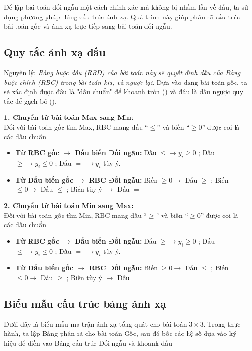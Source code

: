 
Để lập bài toán đối ngẫu một cách chính xác mà không bị nhầm lẫn về dấu, ta sử dụng phương pháp Bảng cấu trúc ánh xạ. Quá trình này giúp phân rã cấu trúc bài toán gốc và ánh xạ trực tiếp sang bài toán đối ngẫu.

\subsection{Quy tắc ánh xạ dấu}
Nguyên lý: \textit{Ràng buộc dấu (RBD) của bài toán này sẽ quyết định dấu của Ràng buộc chính (RBC) trong bài toán kia, và ngược lại.} Dựa vào dạng bài toán gốc, ta sẽ xác định được đâu là "dấu chuẩn" để khoanh tròn (\khoanh{}) và đâu là dấu ngược quy tắc để gạch bỏ (\cancel{}).

\textbf{1. Chuyển từ bài toán Max sang Min:}\\
Đối với bài toán gốc tìm Max, RBC mang dấu ``$\le$'' và biến ``$\ge 0$'' được coi là các dấu chuẩn.
\begin{itemize}
    \item \textbf{Từ RBC gốc $\rightarrow$ Dấu biến Đối ngẫu:} Dấu $\le \longrightarrow y_i \ge 0$ ; Dấu $\ge \longrightarrow y_i \le 0$ ; Dấu $=$ $\longrightarrow y_i$ tùy ý.
    \item \textbf{Từ Dấu biến gốc $\rightarrow$ RBC Đối ngẫu:} Biến $\ge 0 \longrightarrow$ Dấu $\ge$ ; Biến $\le 0 \longrightarrow$ Dấu $\le$ ; Biến tùy ý $\longrightarrow$ Dấu $=$.
\end{itemize}

\textbf{2. Chuyển từ bài toán Min sang Max:}\\
Đối với bài toán gốc tìm Min, RBC mang dấu ``$\ge$'' và biến ``$\ge 0$'' được coi là các dấu chuẩn.
\begin{itemize}
    \item \textbf{Từ RBC gốc $\rightarrow$ Dấu biến Đối ngẫu:} Dấu $\ge \longrightarrow y_i \ge 0$ ; Dấu $\le \longrightarrow y_i \le 0$ ; Dấu $=$ $\longrightarrow y_i$ tùy ý.
    \item \textbf{Từ Dấu biến gốc $\rightarrow$ RBC Đối ngẫu:} Biến $\ge 0 \longrightarrow$ Dấu $\le$ ; Biến $\le 0 \longrightarrow$ Dấu $\ge$ ; Biến tùy ý $\longrightarrow$ Dấu $=$.
\end{itemize}

\subsection{Biểu mẫu cấu trúc bảng ánh xạ}
Dưới đây là biểu mẫu ma trận ánh xạ tổng quát cho bài toán $3 \times 3$. Trong thực hành, ta lập Bảng phân rã cho bài toán Gốc, sau đó bốc các hệ số dựa vào ký hiệu để điền vào Bảng cấu trúc Đối ngẫu và khoanh dấu.

